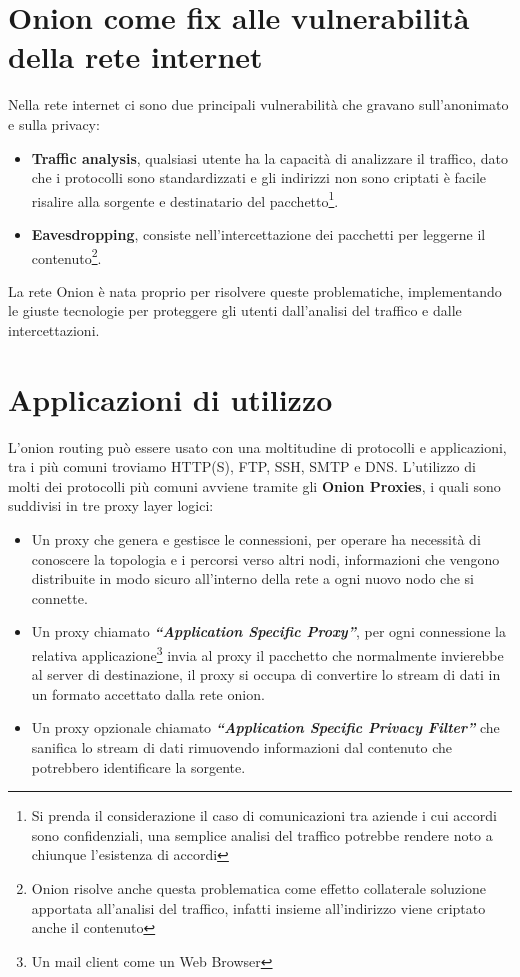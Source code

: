 \newpage

\section{Onion come fix alle vulnerabilità della rete internet}
Nella rete internet ci sono due principali vulnerabilità che gravano sull'anonimato e sulla privacy:
\begin{itemize}
    \item \textbf{Traffic analysis}, qualsiasi utente ha la capacità di analizzare il traffico, dato che i protocolli sono standardizzati e gli indirizzi non sono criptati è facile risalire alla sorgente e destinatario del pacchetto\footnote{Si prenda il considerazione il caso di comunicazioni tra aziende i cui accordi sono confidenziali, una semplice analisi del traffico potrebbe rendere noto a chiunque l'esistenza di accordi}.
    \item \textbf{Eavesdropping}, consiste nell'intercettazione dei pacchetti per leggerne il contenuto\footnote{Onion risolve anche questa problematica come effetto collaterale soluzione apportata all'analisi del traffico, infatti insieme all'indirizzo viene criptato anche il contenuto}.
\end{itemize}
La rete Onion è nata proprio per risolvere queste problematiche, implementando le giuste tecnologie per proteggere gli utenti dall'analisi del traffico e dalle intercettazioni.
\cite{AnonymousConnections}

\section{Applicazioni di utilizzo}
L'onion routing può essere usato con una moltitudine di protocolli e applicazioni, tra i più comuni troviamo HTTP(S), FTP, SSH, SMTP e DNS. 
L'utilizzo di molti dei protocolli più comuni avviene tramite gli \textbf{Onion Proxies}, i quali sono suddivisi in tre proxy layer logici:
\begin{itemize}
    \item Un proxy che genera e gestisce le connessioni, per operare ha necessità di conoscere la topologia e i percorsi verso altri nodi, informazioni che vengono distribuite in modo sicuro all'interno della rete a ogni nuovo nodo che si connette.
    \item Un proxy chiamato \emph{\textbf{“Application Specific Proxy”}}, per ogni connessione la relativa applicazione\footnote{Un mail client come un Web Browser} invia al proxy il pacchetto che normalmente invierebbe al server di destinazione, il proxy si occupa di convertire lo stream di dati in un formato accettato dalla rete onion.
    \item Un proxy opzionale chiamato \emph{\textbf{“Application Specific Privacy Filter”}} che sanifica lo stream di dati rimuovendo informazioni dal contenuto che potrebbero identificare la sorgente.
\end{itemize}

